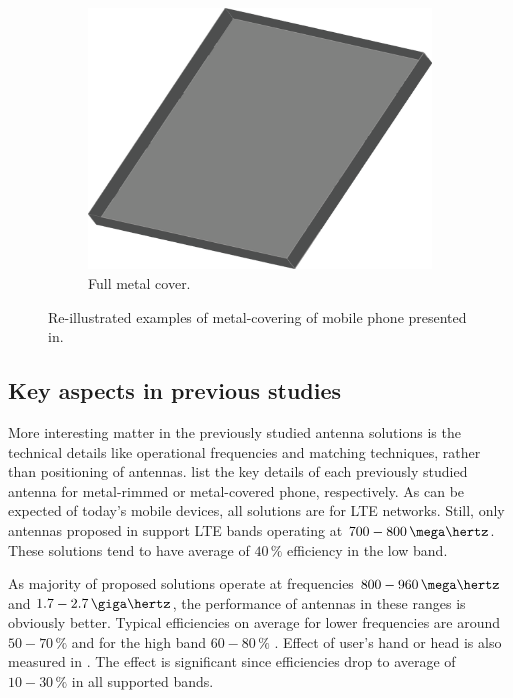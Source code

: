 \begin{figure}[H]
\begin{subfigure}[b]{0.3\textwidth}
        \includegraphics[width=\textwidth]{img/metal_cover_full.eps}
        \caption{Full metal cover.}
        \label{fig:full_cover}
    \end{subfigure}
    \caption{Re-illustrated examples of metal-covering of mobile phone presented in\cite{chen_compact_lte}.}
    \label{fig:metal_covers}
\end{figure}



\subsection{Key aspects in previous studies}
\label{sec:key_aspects}
More interesting matter in the previously studied antenna solutions is the technical details like operational frequencies and matching techniques, rather than positioning of antennas.  list the key details of each previously studied antenna for metal-rimmed or metal-covered phone, respectively. As can be expected of today's mobile devices, all solutions are for LTE networks. Still, only antennas proposed in \cite{stanley_lte_mimo, son_wideband_mimo, chen_compact_lte, chen_metal_frame,valkonen_multifeed} support LTE bands operating at $700-800\,\mega\hertz$. These solutions tend to have average of $40\,\%$ efficiency in the low band. 

As majority of proposed solutions operate at frequencies $800-960\,\mega\hertz$ and $1.7-2.7\,\giga\hertz$, the performance of antennas in these ranges is obviously better. Typical efficiencies on average for lower frequencies are around $50-70\,\%$ and for the high band $60-80\,\%$ \cite{ban_dual_loop,chen_compact_lte,son_wideband_mimo,chen_metal_frame,zhong_pier}. Effect of user's hand or head is also measured in \cite{zhong_pier, chen_metal_frame,ban_dual_loop,reconf_narrow,hybrid,hepta_ifa}. The effect is significant since efficiencies drop to average of $10-30\,\%$ in all supported bands. 


